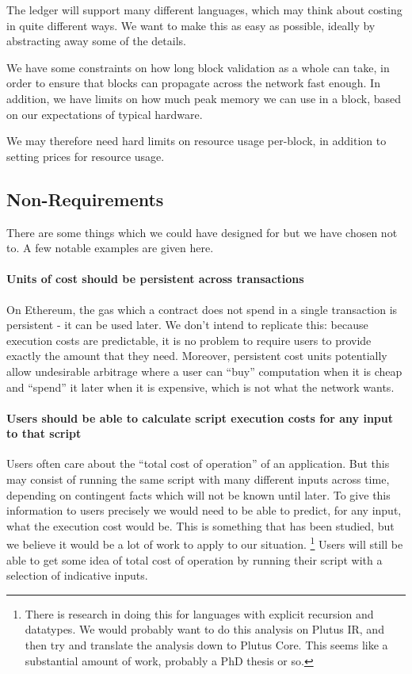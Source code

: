 \begin{requirement}
\label{req:costing-language-agnostic}
The ledger will support many different languages, which may think about costing in quite different ways.
We want to make this as easy as possible, ideally by abstracting away some of the details.
\end{requirement}

\begin{requirement}
\label{req:costing-block-budget}
We have some constraints on how long block validation as a whole can take, in order to ensure that blocks can propagate across the network fast enough.
In addition, we have limits on how much peak memory we can use in a block, based on our expectations of typical hardware.

We may therefore need hard limits on resource usage per-block, in addition to setting prices for resource usage.
\end{requirement}

\subsection{Non-Requirements}
There are some things which we could have designed for but we have chosen not to.
A few notable examples are given here.

\paragraph{Units of cost should be persistent across transactions}
On Ethereum, the gas which a contract does not spend in a single transaction is persistent - it can be used later.
We don't intend to replicate this: because execution costs are predictable, it is no problem to require users to provide exactly the amount that they need.
Moreover, persistent cost units potentially allow undesirable arbitrage where a user can ``buy'' computation when it is cheap and ``spend'' it later when it is expensive, which is not what the network wants.

\paragraph{Users should be able to calculate script execution costs for any input to that script}
Users often care about the ``total cost of operation'' of an application.
But this may consist of running the same script with many different inputs across time, depending on contingent facts which will not be known until later.
To give this information to users precisely we would need to be able to predict, for any input, what the execution cost would be.
This is something that has been studied, but we believe it would be a lot of work to apply to our situation.
\footnote{
  There is research in doing this for languages with explicit recursion and datatypes.
  We would probably want to do this analysis on Plutus IR, and then try and translate the analysis down to Plutus Core.
  This seems like a substantial amount of work, probably a PhD thesis or so.
}
Users will still be able to get some idea of total cost of operation by running their script with a selection of indicative inputs.

